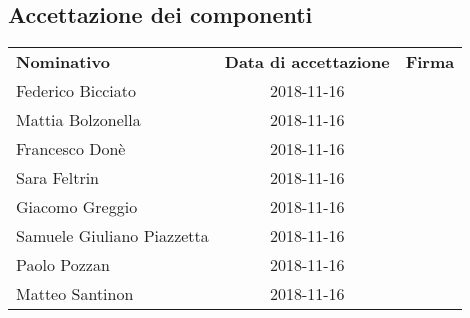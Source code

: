 \subsection{Accettazione dei componenti}
\begin{table}[H]
	\centering\renewcommand{\arraystretch}{1.5}
	
	\begin{tabular}{l c M{0.35\textwidth}}
		
		
		\rowcolorhead 
		{ \textbf{Nominativo}} &
		{ \textbf{Data di accettazione}} &
		{ \textbf{Firma}}  \\
		
		\rowcolorlight
		Federico Bicciato & 2018-11-16 &   \\ 
		\rowcolordark
		Mattia Bolzonella & 2018-11-16 &   \\ 
		\rowcolorlight
		Francesco Donè & 2018-11-16 &   \\ 
		\rowcolordark
		Sara Feltrin & 2018-11-16 &   \\ 
		\rowcolorlight
		Giacomo Greggio & 2018-11-16 &   \\ 
		\rowcolordark
		Samuele Giuliano Piazzetta & 2018-11-16 &   \\ 
		\rowcolorlight
		Paolo Pozzan & 2018-11-16 &   \\ 
		\rowcolordark
		Matteo Santinon & 2018-11-16 &   \\ 
	\end{tabular}
\end{table}

